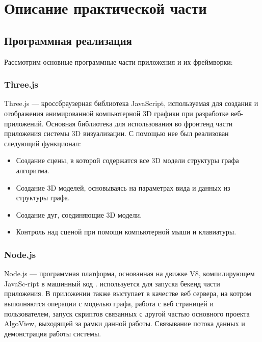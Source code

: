 \section{Описание практической части}
\label{sec:Chapter4} 

\subsection{Программная реализация }

Рассмотрим основные программные части приложения и их фреймворки:

\subsubsection{Three.js}

Three.js — кроссбраузерная библиотека JavaScript, используемая для создания и отображения анимированной компьютерной 3D графики при разработке веб-приложений. Основная библиотека для использования во фронтенд части приложения системы 3D визуализации. С помощью нее был реализован следующий функционал:

\begin{itemize}
    \item Создание сцены, в которой содержатся все 3D модели структуры графа алгоритма.
    \item Создание 3D моделей, основываясь на параметрах вида и данных из структуры графа.
    \item Создание дуг, соединяющие 3D модели.
    \item Контроль над сценой при помощи компьютерной мыши и клавиатуры.
\end{itemize}

\subsubsection{Node.js}

Node.js — программная платформа, основанная на движке V8, компилирующем JavaSc-ript в машинный код \cite{nodejs_offc}. используется для запуска бекенд части приложения. В приложении также выступает в качестве веб сервера, на котром выполняются операции с моделью графа, работа с веб страницей и пользователем, запуск скриптов связанных с другой частью основного проекта AlgoView, выходящей за рамки данной работы. Связывание потока данных и демонстрация работы системы.

